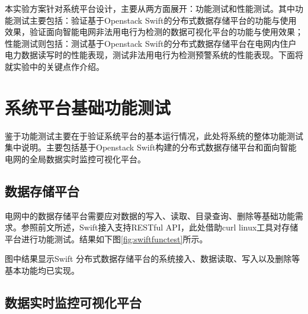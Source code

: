 本实验方案针对系统平台设计，主要从两方面展开：功能测试和性能测试。其中功能测试主要包括：验证基于Openstack Swift的分布式数据存储平台的功能与使用效果，验证面向智能电网非法用电行为检测的数据可视化平台的功能与使用效果；性能测试则包括：测试基于Openstack Swift的分布式数据存储平台在电网内住户电力数据读写时的性能表现，测试非法用电行为检测预警系统的性能表现。下面将就实验中的关键点作介绍。

\section{系统平台基础功能测试}

鉴于功能测试主要在于验证系统平台的基本运行情况，此处将系统的整体功能测试集中说明。主要包括基于Openstack Swift构建的分布式数据存储平台和面向智能电网的全局数据实时监控可视化平台。

\subsection{数据存储平台}

电网中的数据存储平台需要应对数据的写入、读取、目录查询、删除等基础功能需求。参照前文所述，Swift接入支持RESTful API，此处借助curl linux工具对存储平台进行功能测试。结果如下图\ref{fig:swiftfunctest}所示。

\begin{figure}[!htp]
  \centering
  \hspace{1in}
  \hspace{1in}
  \hspace{1in}
\end{figure}

图中结果显示Swift 分布式数据存储平台的系统接入、数据读取、写入以及删除等基本功能均已实现。

\subsection{数据实时监控可视化平台}

